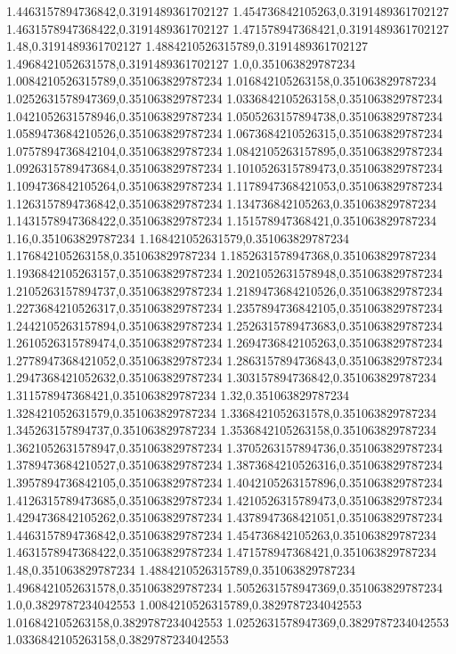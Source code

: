 1.4463157894736842,0.3191489361702127
1.454736842105263,0.3191489361702127
1.4631578947368422,0.3191489361702127
1.471578947368421,0.3191489361702127
1.48,0.3191489361702127
1.4884210526315789,0.3191489361702127
1.4968421052631578,0.3191489361702127
1.0,0.351063829787234
1.0084210526315789,0.351063829787234
1.016842105263158,0.351063829787234
1.0252631578947369,0.351063829787234
1.0336842105263158,0.351063829787234
1.0421052631578946,0.351063829787234
1.0505263157894738,0.351063829787234
1.0589473684210526,0.351063829787234
1.0673684210526315,0.351063829787234
1.0757894736842104,0.351063829787234
1.0842105263157895,0.351063829787234
1.0926315789473684,0.351063829787234
1.1010526315789473,0.351063829787234
1.1094736842105264,0.351063829787234
1.1178947368421053,0.351063829787234
1.1263157894736842,0.351063829787234
1.134736842105263,0.351063829787234
1.1431578947368422,0.351063829787234
1.151578947368421,0.351063829787234
1.16,0.351063829787234
1.168421052631579,0.351063829787234
1.176842105263158,0.351063829787234
1.1852631578947368,0.351063829787234
1.1936842105263157,0.351063829787234
1.2021052631578948,0.351063829787234
1.2105263157894737,0.351063829787234
1.2189473684210526,0.351063829787234
1.2273684210526317,0.351063829787234
1.2357894736842105,0.351063829787234
1.2442105263157894,0.351063829787234
1.2526315789473683,0.351063829787234
1.2610526315789474,0.351063829787234
1.2694736842105263,0.351063829787234
1.2778947368421052,0.351063829787234
1.2863157894736843,0.351063829787234
1.2947368421052632,0.351063829787234
1.303157894736842,0.351063829787234
1.311578947368421,0.351063829787234
1.32,0.351063829787234
1.328421052631579,0.351063829787234
1.3368421052631578,0.351063829787234
1.345263157894737,0.351063829787234
1.3536842105263158,0.351063829787234
1.3621052631578947,0.351063829787234
1.3705263157894736,0.351063829787234
1.3789473684210527,0.351063829787234
1.3873684210526316,0.351063829787234
1.3957894736842105,0.351063829787234
1.4042105263157896,0.351063829787234
1.4126315789473685,0.351063829787234
1.4210526315789473,0.351063829787234
1.4294736842105262,0.351063829787234
1.4378947368421051,0.351063829787234
1.4463157894736842,0.351063829787234
1.454736842105263,0.351063829787234
1.4631578947368422,0.351063829787234
1.471578947368421,0.351063829787234
1.48,0.351063829787234
1.4884210526315789,0.351063829787234
1.4968421052631578,0.351063829787234
1.5052631578947369,0.351063829787234
1.0,0.3829787234042553
1.0084210526315789,0.3829787234042553
1.016842105263158,0.3829787234042553
1.0252631578947369,0.3829787234042553
1.0336842105263158,0.3829787234042553
